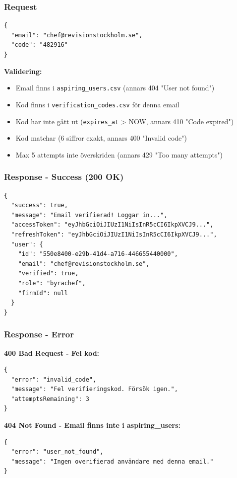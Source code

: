 \documentclass[12pt,a4paper]{article}
\begin{document}
\subsubsection{Request}
\begin{lstlisting}
{
  "email": "chef@revisionstockholm.se",
  "code": "482916"
}
\end{lstlisting}

\textbf{Validering:}
\begin{itemize}[noitemsep]
  \item Email finns i \texttt{aspiring\_users.csv} (annars 404 "User not found")
  \item Kod finns i \texttt{verification\_codes.csv} för denna email
  \item Kod har inte gått ut (\texttt{expires\_at} > NOW, annars 410 "Code expired")
  \item Kod matchar (6 siffror exakt, annars 400 "Invalid code")
  \item Max 5 attempts inte överskriden (annars 429 "Too many attempts")
\end{itemize}

\subsubsection{Response - Success (200 OK)}
\begin{lstlisting}
{
  "success": true,
  "message": "Email verifierad! Loggar in...",
  "accessToken": "eyJhbGciOiJIUzI1NiIsInR5cCI6IkpXVCJ9...",
  "refreshToken": "eyJhbGciOiJIUzI1NiIsInR5cCI6IkpXVCJ9...",
  "user": {
    "id": "550e8400-e29b-41d4-a716-446655440000",
    "email": "chef@revisionstockholm.se",
    "verified": true,
    "role": "byrachef",
    "firmId": null
  }
}
\end{lstlisting}

\subsubsection{Response - Error}

\textbf{400 Bad Request - Fel kod:}
\begin{lstlisting}
{
  "error": "invalid_code",
  "message": "Fel verifieringskod. Försök igen.",
  "attemptsRemaining": 3
}
\end{lstlisting}

\textbf{404 Not Found - Email finns inte i aspiring\_users:}
\begin{lstlisting}
{
  "error": "user_not_found",
  "message": "Ingen overifierad användare med denna email."
}
\end{lstlisting}
\end{document}
